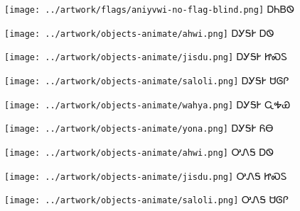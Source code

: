 \documentclass[avery5371,frame]{flashcards}%
\begin{document}
\begin{flashcard}{
\texttt{[image: ../artwork/flags/aniyvwi-no-flag-blind.png]}
}\Huge ᎠᏂᏴᏫ
\end{flashcard}


\begin{flashcard}{
\texttt{[image: ../artwork/objects-animate/ahwi.png]}
}\Huge ᎠᎩᎦᎨ ᎠᏫ
\end{flashcard}

\begin{flashcard}{
\texttt{[image: ../artwork/objects-animate/jisdu.png]}
}\Huge ᎠᎩᎦᎨ ᏥᏍᏚ
\end{flashcard}

\begin{flashcard}{
\texttt{[image: ../artwork/objects-animate/saloli.png]}
}\Huge ᎠᎩᎦᎨ ᏌᎶᎵ
\end{flashcard}

\begin{flashcard}{
\texttt{[image: ../artwork/objects-animate/wahya.png]}
}\Huge ᎠᎩᎦᎨ ᏩᎭᏯ
\end{flashcard}

\begin{flashcard}{
\texttt{[image: ../artwork/objects-animate/yona.png]}
}\Huge ᎠᎩᎦᎨ ᏲᎾ
\end{flashcard}

\begin{flashcard}{
\texttt{[image: ../artwork/objects-animate/ahwi.png]}
}\Huge ᎤᏁᎦ ᎠᏫ
\end{flashcard}

\begin{flashcard}{
\texttt{[image: ../artwork/objects-animate/jisdu.png]}
}\Huge ᎤᏁᎦ ᏥᏍᏚ
\end{flashcard}

\begin{flashcard}{
\texttt{[image: ../artwork/objects-animate/saloli.png]}
}\Huge ᎤᏁᎦ ᏌᎶᎵ
\end{flashcard}
\end{document}
